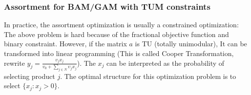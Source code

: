 \documentclass[10pt]{report}
\begin{document}
\subsubsection{Assortment for BAM/GAM with TUM constraints}
In practice, the assortment optimization is usually a constrained optimization:
The above problem is hard because of the fractional objective function and binary constraint. However, if the matrix $a$ is TU (totally unimodular), It can be 
transformed into linear programming (This is called Cooper Transformation, rewrite $y_j=\frac{v_jx_j}{v_0+\sum_{j\in N}\upsilon_jx_j}$).
The $x_j$ can be interpreted as the probability of selecting product $j$. The optimal structure for this optimization problem is to select $\{x_j:x_j>0\}$.
\end{document}

